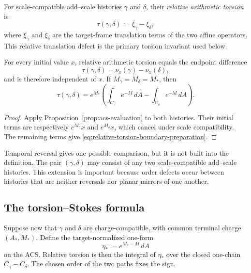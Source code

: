 \begin{definition}
\label{def:relative-torsion}
For scale-compatible add--scale histories \(\gamma\) and \(\delta\), their \emph{relative
arithmetic torsion} is
\begin{equation}
    \tau(\gamma,\delta)
       :=\xi_\gamma-\xi_\delta,
    \label{eq:relative-torsion}
\end{equation}
where \(\xi_\gamma\) and \(\xi_\delta\) are the target-frame translation
terms of the two affine operators.  This relative translation defect is the
primary torsion invariant used below.
\end{definition}

\begin{proposition}
\label{prop:relative-torsion-independent}
For every initial value \(x\), relative arithmetic torsion equals the endpoint
difference
\[
    \tau(\gamma,\delta)
      =\nu_x(\gamma)-\nu_x(\delta),
\]
and is therefore independent of \(x\).
If \(M_\gamma=M_\delta=M_*\), then
\begin{equation}
    \tau(\gamma,\delta)
      =e^{M_*}
        \left(
          \int_{C_\gamma}e^{-M}\,dA
          -\int_{C_\delta}e^{-M}\,dA
        \right).
    \label{eq:relative-torsion-boundary-preparation}
\end{equation}
\end{proposition}

\begin{proof}
Apply Proposition~\ref{prop:acs-evaluation} to both histories.  Their initial
terms are respectively \(e^{M_\gamma}x\) and \(e^{M_\delta}x\), which cancel
under scale compatibility.  The remaining terms give
\eqref{eq:relative-torsion-boundary-preparation}.
\end{proof}

Temporal reversal gives one possible comparison, but it is not built into the
definition.  The pair \((\gamma,\delta)\) may consist of any two
scale-compatible add--scale histories.  This extension is important because order defects
occur between histories that are neither reversals nor planar mirrors of one
another.

\subsection{The torsion--Stokes formula}

Suppose now that \(\gamma\) and \(\delta\) are charge-compatible, with common
terminal charge \((A_*,M_*)\).  Define the target-normalized one-form
\begin{equation}
    \eta_*:=e^{M_*-M}\,dA
    \label{eq:target-normalized-acs-form}
\end{equation}
on the ACS.  Relative torsion is then the integral of \(\eta_*\) over the
closed one-chain \(C_\gamma-C_\delta\).  The chosen order of the two paths
fixes the sign.

